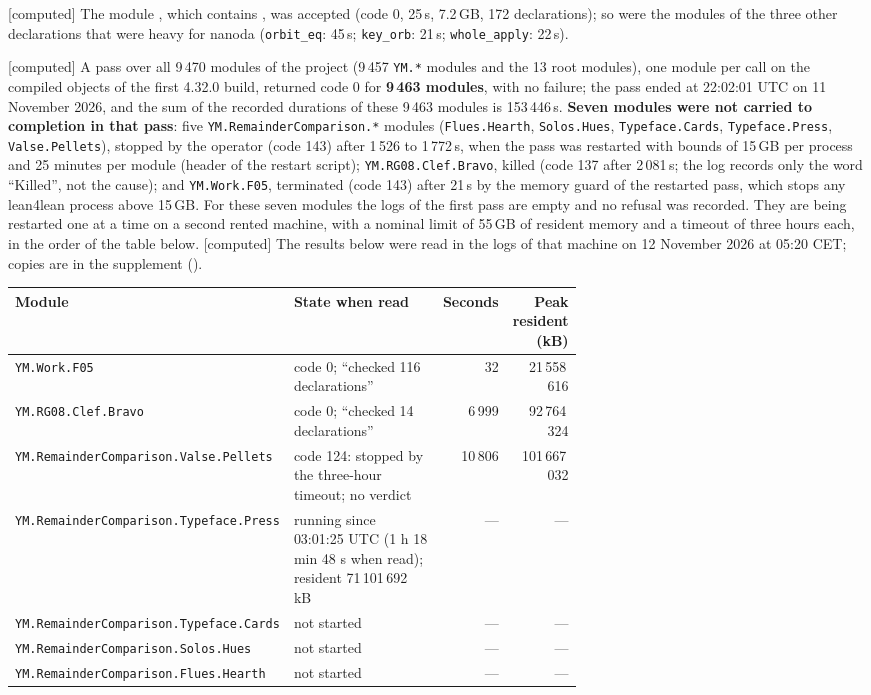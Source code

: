 \documentclass[11pt,a4paper]{article}
\theoremstyle{plain}
\theoremstyle{definition}
\theoremstyle{remark}
\numberwithin{equation}{section}
\newcommand{\st}[1]{\textsf{[#1]}}
\begin{document}
\st{computed} The module , which contains , was accepted
(code 0, 25\,s, 7.2\,GB, 172 declarations); so were the modules of the three other declarations that were heavy for nanoda
(\texttt{orbit\_eq}: 45\,s; \texttt{key\_orb}: 21\,s; \texttt{whole\_apply}: 22\,s).

\st{computed} A pass over all 9\,470 modules of the project (9\,457 \texttt{YM.*} modules and the 13 root modules), one module per
call on the compiled objects of the first 4.32.0 build, returned code 0 for \textbf{9\,463 modules}, with no failure; the pass ended at 22:02:01 UTC on 11 November 2026, and the sum of the
recorded durations of these 9\,463 modules is 153\,446\,s. \textbf{Seven modules were not carried to completion in that pass}:
five \texttt{YM.RemainderComparison.*} modules (\texttt{Flues.Hearth}, \texttt{Solos.Hues}, \texttt{Typeface.Cards},
\texttt{Typeface.Press}, \texttt{Valse.Pellets}), stopped by the operator (code 143) after 1\,526 to
1\,772\,s, when the pass was restarted with bounds of 15\,GB per process and 25 minutes per module (header of the restart script); \texttt{YM.RG08.Clef.Bravo}, killed
(code 137 after 2\,081\,s; the log records only the word ``Killed'', not the cause); and \texttt{YM.Work.F05}, terminated (code 143) after 21\,s by the memory guard of the restarted pass, which stops any
lean4lean process above 15\,GB. For these seven modules the logs of the first pass are empty and no refusal was recorded.
They are being restarted one at a time on a second rented machine, with a nominal limit of 55\,GB of resident memory and a timeout of three hours each, in the order of the table below.
\st{computed} The results below were read in the logs of that machine on 12 November 2026 at 05:20 CET; copies are in the supplement ().
\begin{center}\scriptsize
\begin{tabular}{@{}p{0.33\linewidth}p{0.33\linewidth}rr@{}}
\toprule Module & State when read & Seconds & Peak resident (kB)\\\midrule
\texttt{YM.Work.F05} & code 0; ``checked 116 declarations'' & 32 & 21\,558\,616\\
\texttt{YM.RG08.Clef.Bravo} & code 0; ``checked 14 declarations'' & 6\,999 & 92\,764\,324\\
\texttt{YM.RemainderComparison.Valse.Pellets} & code 124: stopped by the three-hour timeout; no verdict & 10\,806 & 101\,667\,032\\
\texttt{YM.RemainderComparison.Typeface.Press} & running since 03:01:25 UTC (1 h 18 min 48 s when read); resident 71\,101\,692 kB & --- & ---\\
\texttt{YM.RemainderComparison.Typeface.Cards} & not started & --- & ---\\
\texttt{YM.RemainderComparison.Solos.Hues} & not started & --- & ---\\
\texttt{YM.RemainderComparison.Flues.Hearth} & not started & --- & ---\\
\bottomrule
\end{tabular}\end{center}
\end{document}
